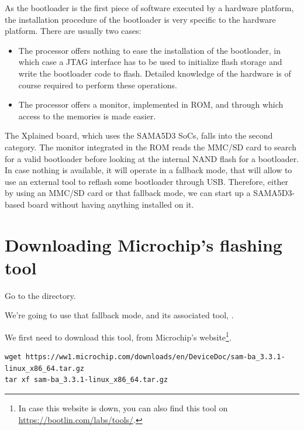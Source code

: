 
As the bootloader is the first piece of software executed by a
hardware platform, the installation procedure of the bootloader is
very specific to the hardware platform. There are usually two cases:

\begin{itemize}

\item The processor offers nothing to ease the installation of the
  bootloader, in which case a JTAG interface has to be used to initialize
  flash storage and write the bootloader code to flash. Detailed
  knowledge of the hardware is of course required to perform these
  operations.

\item The processor offers a monitor, implemented in ROM, and through
  which access to the memories is made easier.

\end{itemize}

The Xplained board, which uses the SAMA5D3 SoCs, falls into the second
category. The monitor integrated in the ROM reads the MMC/SD card to
search for a valid bootloader before looking at the internal NAND
flash for a bootloader. In case nothing is available, it will operate
in a fallback mode, that will allow to use an external tool
to reflash some bootloader through USB. Therefore, either by using an MMC/SD
card or that fallback mode, we can start up a SAMA5D3-based board
without having anything installed on it.

\section{Downloading Microchip's flashing tool}

Go to the  directory.

We're going to use that fallback mode, and its associated tool,
.

We first need to download this tool, from Microchip's website\footnote{
In case this website is down, you can also find this
tool on \url{https://bootlin.com/labs/tools/}.}.

\begin{verbatim}
wget https://ww1.microchip.com/downloads/en/DeviceDoc/sam-ba_3.3.1-linux_x86_64.tar.gz
tar xf sam-ba_3.3.1-linux_x86_64.tar.gz
\end{verbatim}

